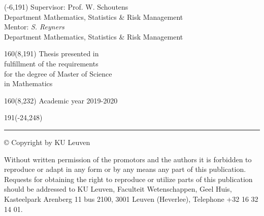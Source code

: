 \documentclass[12pt,a4paper,oneside]{book}
\begin{document}
%
\begin{textblock}{70}(-6,191)
\textblockcolour{}
\vspace{-\parskip}
\flushleft
Supervisor: Prof. W. Schoutens\\[-2pt]
\textcolor{blueaff}{Department Mathematics, \textsl{}}
\textcolor{blueaff}{Statistics \& Risk Management \textsl{}}\\[5pt]
Mentor: \textsl{S. Reyners}\\[-2pt]
\textcolor{blueaff}{Department Mathematics, \textsl{}}
\textcolor{blueaff}{Statistics \& Risk Management \textsl{}}\\[5pt]
\end{textblock}
%
\begin{textblock}{160}(8,191)
\textblockcolour{}
\vspace{-\parskip}
\flushright
Thesis presented in\\[4.5pt]
fulfillment of the requirements\\[4.5pt]
for the degree of Master of Science\\[4.5pt]
in Mathematics\\
\end{textblock}
%
\begin{textblock}{160}(8,232)
\textblockcolour{}
\vspace{-\parskip}
\flushright
Academic year 2019-2020
\end{textblock}
%
\begin{textblock}{191}(-24,248)
{\color{blueline}\rule{550pt}{5.5pt}}
\end{textblock}
%
\vfill
\newpage

\rmfamily
\setcounter{page}{0}


\newpage

© Copyright by KU Leuven

Without written permission of the promotors and the authors it is forbidden to reproduce or adapt in any form or by any means any part of this publication. Requests for obtaining the right to reproduce or utilize parts of this publication should be addressed to KU Leuven, Faculteit Wetenschappen, Geel Huis, Kasteelpark Arenberg 11 bus 2100, 3001 Leuven (Heverlee), Telephone +32 16 32 14 01.
\end{document}
